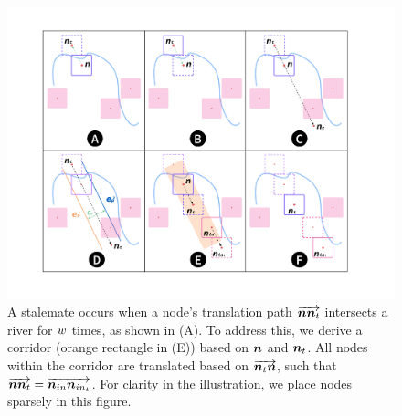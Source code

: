     {
        \begin{figure}[tb!]
            \centering
            \includegraphics[width=\columnwidth,keepaspectratio]{figure/corridor.png}
            \caption{A stalemate occurs when a node's translation path $ \protect\overrightarrow{\bm{n}\bm{n}_t} $ intersects a river for $ w $ times, as shown in (A). To address this, we derive a corridor (orange rectangle in (E)) based on $ \bm{n} $ and $ \bm{n}_t $. All nodes within the corridor are translated based on $ \protect\overrightarrow{\bm{n}_t\bm{n}} $, such that $ \protect\overrightarrow{\bm{n}\bm{n}_{t}} = \protect\overrightarrow{\bm{n}_{in}\bm{n}_{in_t}} $. For clarity in the illustration, we place nodes sparsely in this figure.}
            \label{fig:corridor}
        \end{figure}
    }


